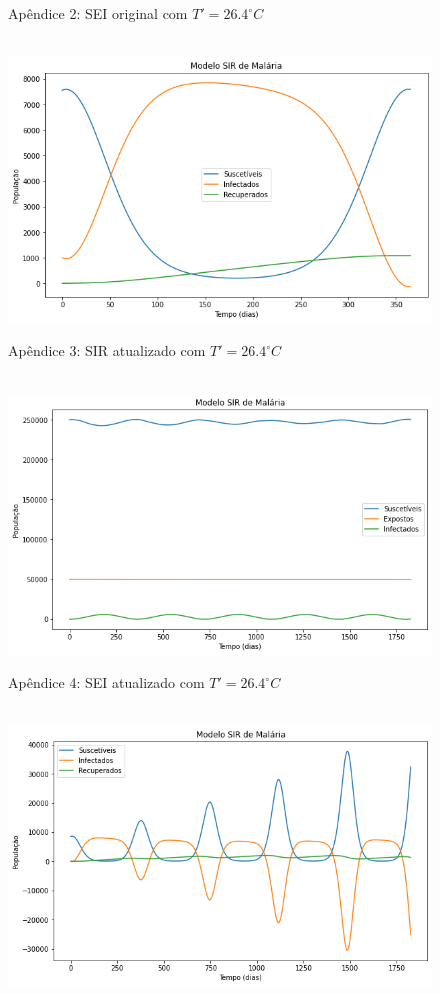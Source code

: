 \documentclass[
	12pt,				%
	oneside,			%
	a4paper,			%
	english,			%
	brazil				%
	]{abntex2}
\begin{document}
\begin{apendicesenv}
\begin{figure}[!ht]
	\caption*{Apêndice 2: SEI original com $T'=26.4^\circ C$}
\end{figure} 
\newpage
\begin{figure}[!ht]
	\centering
	\hbox{\hspace{3.5em} \includegraphics[scale=0.55] {SIR_a_correto.png}}
	\caption*{Apêndice 3: SIR atualizado com $T'=26.4^\circ C$}
\end{figure} 
\begin{figure}[!ht]
	\centering
	\hbox{\hspace{3.0em} \includegraphics[scale=0.55] {SEI_a_correto.png}}
	\caption*{Apêndice 4: SEI atualizado com $T'=26.4^\circ C$}
\end{figure}
\newpage
\begin{figure}[!ht]
	\centering
	\hbox{\hspace{2.0em} \includegraphics[scale=0.55] {SIR_Correcao_b3.png}}

\end{figure}
\end{apendicesenv}
\end{document}
